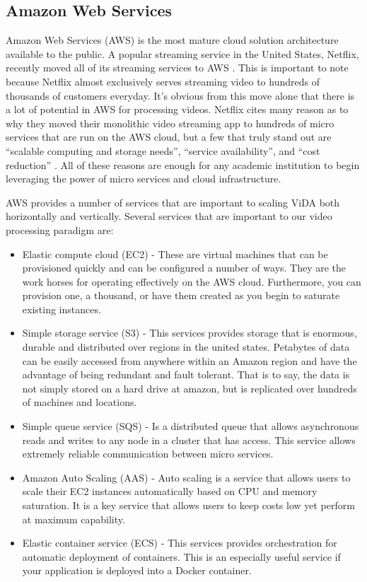 \subsection{\label{subsection:aws}Amazon Web Services}
Amazon Web Services (AWS) is the most mature cloud solution architecture
available to the public. A popular streaming service in the United States,
Netflix, recently moved all of its streaming services to AWS
\cite{netflixawsmove}. This is important to note because Netflix almost
exclusively serves streaming video to hundreds of thousands of customers
everyday. It's obvious from this move alone that there is a lot of potential in
AWS for processing videos. Netflix cites many reason as to why they moved their
monolithic video streaming app to hundreds of micro services that are run on the
AWS cloud, but a few that truly stand out are \enquote{scalable computing and
storage needs}, \enquote{service availability}, and \enquote{cost reduction}
\cite{netflixawsmove}. All of these reasons are enough for any academic
institution to begin leveraging the power of micro services and cloud
infrastructure.

AWS provides a number of services that are important to scaling ViDA
both horizontally and vertically. Several services that are important to
our video processing paradigm are:
\begin{itemize}
\item Elastic compute cloud (EC2) - These are virtual machines that can be
provisioned quickly and can be configured a number of ways. They are the work
horses for operating effectively on the AWS cloud. Furthermore, you can
provision one, a thousand, or have them created as you begin to saturate
existing instances.
\item Simple storage service (S3) - This services provides storage that is enormous,
durable and distributed over regions in the united states. Petabytes of data can
be easily accessed from anywhere within an Amazon region and have the advantage
of being redundant and fault tolerant. That is to say, the data is not simply
stored on a hard drive at amazon, but is replicated over hundreds of machines
and locations.
\item Simple queue service (SQS) - Is a distributed queue that allows asynchronous
reads and writes to any node in a cluster that has access. This service allows
extremely reliable communication between micro services.
\item Amazon Auto Scaling (AAS) - Auto scaling is a service that allows users
to scale their EC2 instances automatically based on CPU and memory saturation. It
is a key service that allows users to keep costs low yet perform at maximum
capability.
\item Elastic container service (ECS) - This services provides orchestration for
automatic deployment of containers. This is an especially useful service if
your application is deployed into a Docker container.
\end{itemize}

